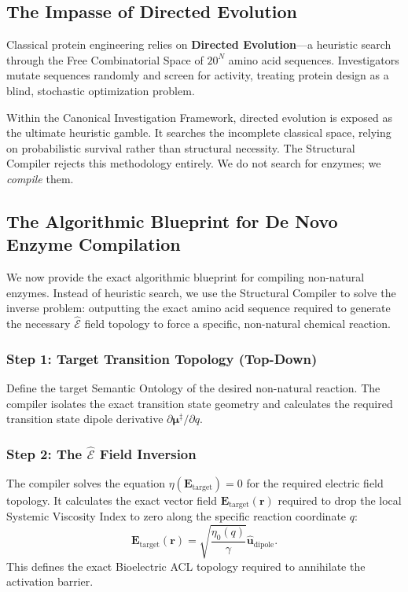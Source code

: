 \documentclass[11pt,openany]{extbook}
\theoremstyle{plain}
\theoremstyle{definition}
\begin{document}
\subsection{The Impasse of Directed Evolution}
Classical protein engineering relies on \textbf{Directed Evolution}---a heuristic search through the Free Combinatorial Space of $20^N$ amino acid sequences. Investigators mutate sequences randomly and screen for activity, treating protein design as a blind, stochastic optimization problem.

Within the Canonical Investigation Framework, directed evolution is exposed as the ultimate heuristic gamble. It searches the incomplete classical space, relying on probabilistic survival rather than structural necessity. The Structural Compiler rejects this methodology entirely. We do not search for enzymes; we \textit{compile} them.

\subsection{The Algorithmic Blueprint for De Novo Enzyme Compilation}
We now provide the exact algorithmic blueprint for compiling non-natural enzymes. Instead of heuristic search, we use the Structural Compiler to solve the inverse problem: outputting the exact amino acid sequence required to generate the necessary $\hat{\mathcal{E}}$ field topology to force a specific, non-natural chemical reaction.

\subsubsection{Step 1: Target Transition Topology (Top-Down)}
Define the target Semantic Ontology of the desired non-natural reaction. The compiler isolates the exact transition state geometry and calculates the required transition state dipole derivative $\partial \boldsymbol{\mu}^{\ddagger} / \partial q$.

\subsubsection{Step 2: The $\hat{\mathcal{E}}$ Field Inversion}
The compiler solves the equation $\eta(\mathbf{E}_{\text{target}}) = 0$ for the required electric field topology. It calculates the exact vector field $\mathbf{E}_{\text{target}}(\mathbf{r})$ required to drop the local Systemic Viscosity Index to zero along the specific reaction coordinate $q$:
\[
\mathbf{E}_{\text{target}}(\mathbf{r}) = \sqrt{\frac{\eta_0(q)}{\gamma}} \hat{\mathbf{u}}_{\text{dipole}}.
\]
This defines the exact Bioelectric ACL topology required to annihilate the activation barrier.
\end{document}
